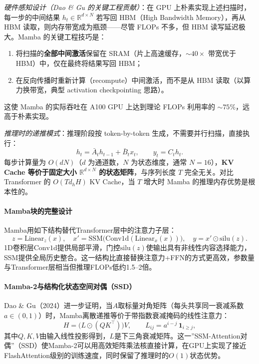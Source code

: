 \documentclass[12pt,a4paper]{article}
\begin{document}
\textit{硬件感知设计（Dao \& Gu 的关键工程贡献）}：在 GPU 上朴素实现上述扫描时，每一步的中间结果 $h_t \in \mathbb{R}^{d \times N}$ 若写回 HBM（High Bandwidth Memory），再从 HBM 读取，则内存带宽成为瓶颈——尽管 FLOPs 不多，但 HBM 读写延迟极大。Mamba 的关键工程技巧是：
\begin{enumerate}
    \item 将扫描的\textbf{全部中间激活}保留在 SRAM（片上高速缓存，$\sim 40\times$ 带宽优于 HBM）中，仅在最终将结果写回 HBM；
    \item 在反向传播时重新计算（recompute）中间激活，而不是从 HBM 读取（以算力换带宽，典型 activation checkpointing 思路）。
\end{enumerate}
这使 Mamba 的实际吞吐在 A100 GPU 上达到理论 FLOPs 利用率的 $\sim 75\%$，远高于朴素实现。

\textit{推理时的递推模式}：推理阶段按 token-by-token 生成，不需要并行扫描，直接执行：
\begin{equation}
h_t = \bar{A}_t h_{t-1} + \bar{B}_t x_t, \qquad y_t = C_t h_t.
\end{equation}
每步计算量为 $O(dN)$（$d$ 为通道数，$N$ 为状态维度，通常 $N=16$），\textbf{KV Cache 等价于固定大小 $\mathbb{R}^{d \times N}$ 的状态矩阵}，与序列长度 $T$ 完全无关。对比 Transformer 的 $O(T d_h H)$ KV Cache，当 $T$ 增大时 Mamba 的推理内存优势是根本性的。

\paragraph{Mamba块的完整设计}

Mamba用如下结构替代Transformer层中的注意力子层：
\begin{equation}
z = \text{Linear}_z(x),\quad
x' = \text{SSM}\bigl(\text{Conv1d}(\text{Linear}_x(x))\bigr),\quad
y = x' \odot \text{silu}(z).
\end{equation}
1D卷积层$\text{Conv1d}$提供局部平滑，门控$\text{silu}(z)$使输出具有非线性内容选择能力，SSM提供全局历史整合。这一结构比直接替换注意力+FFN的方式更高效，参数量与Transformer层相当但推理FLOPs低约1.5--2倍。

\paragraph{Mamba-2与结构化状态空间对偶（SSD）}

Dao \& Gu（2024）进一步证明，当$A$取标量对角矩阵（每头共享同一衰减系数$a \in (0,1)$）时，Mamba离散递推等价于带指数衰减掩码的线性注意力：
\begin{equation}
H = \bigl(L \odot (Q K^\top)\bigr) V,\qquad L_{ij} = a^{i-j}\, \mathbf{1}_{i \ge j},
\end{equation}
其中$Q, K, V$由输入线性投影得到，$L$是下三角衰减矩阵。这一”SSM-Attention对偶”（SSD）使Mamba-2可以用高效矩阵乘法核直接计算，在GPU上实现了接近FlashAttention级别的训练速度，同时保留了推理时的$O(1)$状态优势。
\end{document}
